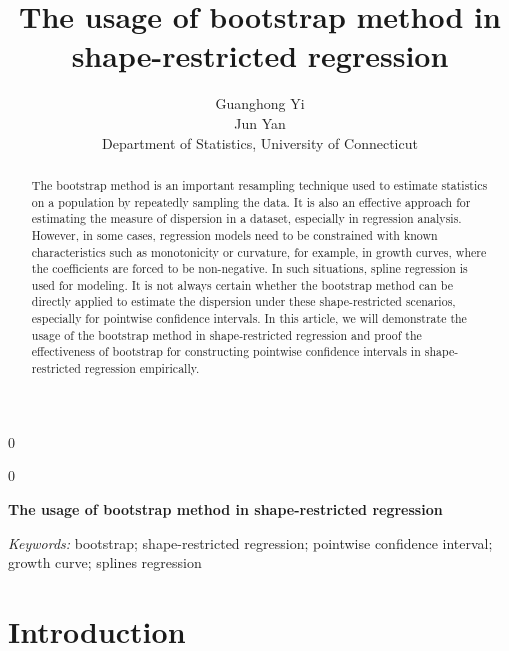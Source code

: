 \documentclass[12pt]{article}
\newcommand{\blind}{0}
\begin{document}
\def\spacingset#1{\renewcommand{\baselinestretch}%
{#1}\small\normalsize} \spacingset{1}



\blind
{
  \title{\bf The usage of bootstrap method in shape-restricted regression}
  \author{Guanghong Yi\\
  Jun Yan\\[1ex]
  Department of Statistics, University of Connecticut\\
}
  \maketitle
} \fi

\blind
{
  \bigskip
  \bigskip
  \bigskip
  \begin{center}
    {\LARGE\bf The usage of bootstrap method in shape-restricted regression}
\end{center}
  \medskip
} \fi

\bigskip
\begin{abstract}
The bootstrap method is an important resampling technique used to estimate statistics on a population by repeatedly sampling the data. It is also an effective approach for estimating the measure of dispersion in a dataset, especially in regression analysis. However, in some cases, regression models need to be constrained with known characteristics such as monotonicity or curvature, for example, in growth curves, where the coefficients are forced to be non-negative. In such situations, spline regression is used for modeling. It is not always certain whether the bootstrap method can be directly applied to estimate the dispersion under these shape-restricted scenarios, especially for pointwise confidence intervals. In this article, we will demonstrate the usage of the bootstrap method in shape-restricted regression and proof the effectiveness of bootstrap for constructing pointwise confidence intervals in shape-restricted regression empirically.
\end{abstract}

\noindent%
{\it Keywords:}  bootstrap; shape-restricted regression; pointwise confidence interval; growth curve; splines regression
\vfill

\newpage
\spacingset{1.45} 
\section{Introduction}
\label{sec:intro}
\end{document}
